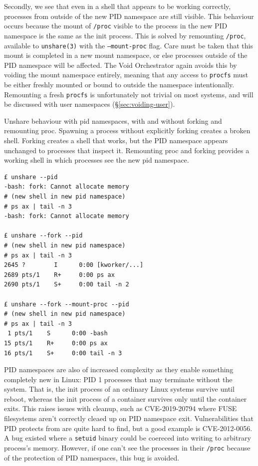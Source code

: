 \documentclass[12pt,a4paper,twoside]{report}
\begin{document}
Secondly, we see that even in a shell that appears to be working correctly, processes from outside of the new PID namespace are still visible. This behaviour occurs because the mount of \texttt{/proc} visible to the process in the new PID namespace is the same as the init process. This is solved by remounting \texttt{/proc}, available to \texttt{unshare(3)} with the \texttt{---mount-proc} flag. Care must be taken that this mount is completed in a new mount namespace, or else processes outside of the PID namespace will be affected. The Void Orchestrator again avoids this by voiding the mount namespace entirely, meaning that any access to \texttt{procfs} must be either freshly mounted or bound to outside the namespace intentionally. Remounting a fresh \texttt{procfs} is unfortunately not trivial on most systems, and will be discussed with user namespaces (§\ref{sec:voiding-user}).

\begin{listing}
\label{lst:unshare-pid}
\caption{Unshare behaviour with pid namespaces, with and without forking and remounting proc. Spawning a process without explicitly forking creates a broken shell. Forking creates a shell that works, but the PID namespace appears unchanged to processes that inspect it. Remounting proc and forking provides a working shell in which processes see the new pid namespace.}

\begin{verbatim}
£ unshare --pid
-bash: fork: Cannot allocate memory
# (new shell in new pid namespace)
# ps ax | tail -n 3
-bash: fork: Cannot allocate memory

£ unshare --fork --pid
# (new shell in new pid namespace)
# ps ax | tail -n 3
2645 ?        I      0:00 [kworker/...]
2689 pts/1    R+     0:00 ps ax
2690 pts/1    S+     0:00 tail -n 2

£ unshare --fork --mount-proc --pid
# (new shell in new pid namespace)
# ps ax | tail -n 3
 1 pts/1    S      0:00 -bash
15 pts/1    R+     0:00 ps ax
16 pts/1    S+     0:00 tail -n 3
\end{verbatim}
\end{listing}

PID namespaces are also of increased complexity as they enable something completely new in Linux: PID 1 processes that may terminate without the system. That is, the init process of an ordinary Linux systems survive until reboot, whereas the init process of a container survives only until the container exits. This raises issues with cleanup, such as CVE-2019-20794 where FUSE filesystems aren't correctly cleaed up on PID namespace exit. Vulnerabilities that PID protects from are quite hard to find, but a good example is CVE-2012-0056. A bug existed where a \texttt{setuid} binary could be coereced into writing to arbitrary process's memory. However, if one can't see the processes in their \texttt{/proc} because of the protection of PID namespaces, this bug is avoided.
\end{document}

